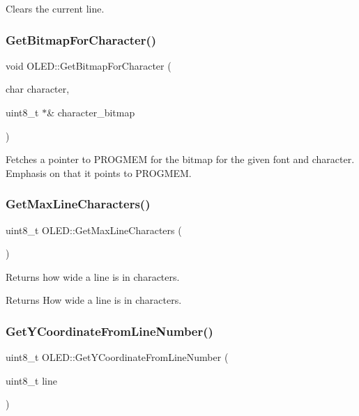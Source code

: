 Clears the current line. \hypertarget{class_o_l_e_d_a3bd2f2f05568441e1e0533eaf0db58f8}{}\label{class_o_l_e_d_a3bd2f2f05568441e1e0533eaf0db58f8} 
\subsubsection{\texorpdfstring{Get\+Bitmap\+For\+Character()}{GetBitmapForCharacter()}}
{\footnotesize\ttfamily void O\+L\+E\+D\+::\+Get\+Bitmap\+For\+Character (\begin{DoxyParamCaption}\item[{char}]{character,  }\item[{uint8\+\_\+t $\ast$\&}]{character\+\_\+bitmap }\end{DoxyParamCaption})\hspace{0.3cm}{\ttfamily [protected]}}

Fetches a pointer to P\+R\+O\+G\+M\+EM for the bitmap for the given font and character. Emphasis on that it points to P\+R\+O\+G\+M\+EM. \hypertarget{class_o_l_e_d_a7bb08915b685741c60bdccdd47781560}{}\label{class_o_l_e_d_a7bb08915b685741c60bdccdd47781560} 
\subsubsection{\texorpdfstring{Get\+Max\+Line\+Characters()}{GetMaxLineCharacters()}}
{\footnotesize\ttfamily uint8\+\_\+t O\+L\+E\+D\+::\+Get\+Max\+Line\+Characters (\begin{DoxyParamCaption}{ }\end{DoxyParamCaption})}

Returns how wide a line is in characters. \begin{DoxyReturn}{Returns}
How wide a line is in characters. 
\end{DoxyReturn}
\hypertarget{class_o_l_e_d_a5b6d41d5d699998f54ea6e3b6562ac5b}{}\label{class_o_l_e_d_a5b6d41d5d699998f54ea6e3b6562ac5b} 
\subsubsection{\texorpdfstring{Get\+Y\+Coordinate\+From\+Line\+Number()}{GetYCoordinateFromLineNumber()}}
{\footnotesize\ttfamily uint8\+\_\+t O\+L\+E\+D\+::\+Get\+Y\+Coordinate\+From\+Line\+Number (\begin{DoxyParamCaption}\item[{uint8\+\_\+t}]{line }\end{DoxyParamCaption})}

